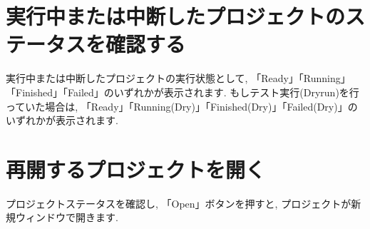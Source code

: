 \documentclass[a4paper,10pt,oneside]{jsbook}
\begin{document}
\section{実行中または中断したプロジェクトのステータスを確認する}
実行中または中断したプロジェクトの実行状態として, 「Ready」「Running」「Finished」「Failed」のいずれかが表示されます.
もしテスト実行(Dryrun)を行っていた場合は, 「Ready」「Running(Dry)」「Finished(Dry)」「Failed(Dry)」のいずれかが表示されます.

\section{再開するプロジェクトを開く}
プロジェクトステータスを確認し, 「Open」ボタンを押すと, プロジェクトが新規ウィンドウで開きます.
\end{document}

